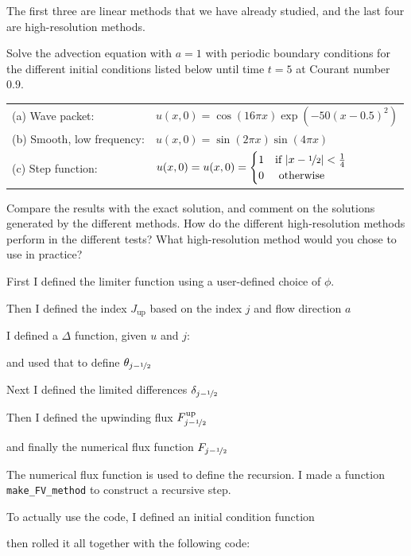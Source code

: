 \documentclass{article} %
\theoremstyle{plain}
\numberwithin{equation}{section} %
\numberwithin{figure}{section} %
\numberwithin{table}{section} %
\begin{document}
{The first three are linear methods that we have already studied, and the last four are high-resolution methods.

Solve the advection equation with $a = 1$ with periodic boundary conditions for the different initial conditions listed below until time $t = 5$ at Courant number $0.9$.

\begin{tabular}{ll}
    (a) Wave packet: & $u(x,0) = \cos(16\pi x)\exp(-50(x-0.5)^2)$ \\
    (b) Smooth, low frequency: & $u(x,0) = \sin(2\pi x)\sin(4\pi x)$ \\
    (c) Step function: & $u(x,0) = u(x,0) = \begin{cases}1 & \text{if } \abs{x - \nicefrac{1}{2}}<\frac{1}{4} \\ 0 & \text{ otherwise} \end{cases}$
\end{tabular}

Compare the results with the exact solution, and comment on the solutions generated by the different methods.  How do the different high-resolution methods perform in the different tests?  What high-resolution method would you chose to use in practice?
}

First I defined the limiter function using a user-defined choice of $\phi$.

Then I defined the index $J_\text{up}$ based on the index $j$ and flow direction $a$

I defined a $\Delta$ function, given $u$ and $j$:

and used that to define $\theta_{j-\nicefrac{1}{2}}$

Next I defined the limited differences $\delta_{j-\nicefrac{1}{2}}$

Then I defined the upwinding flux $F_{j-\nicefrac{1}{2}}^\text{up}$

and finally the numerical flux function $F_{j-\nicefrac{1}{2}}$

The numerical flux function is used to define the recursion.  I made a function \verb|make_FV_method| to construct a recursive step.

To actually use the code, I defined an initial condition function

then rolled it all together with the following code:

\end{document}
